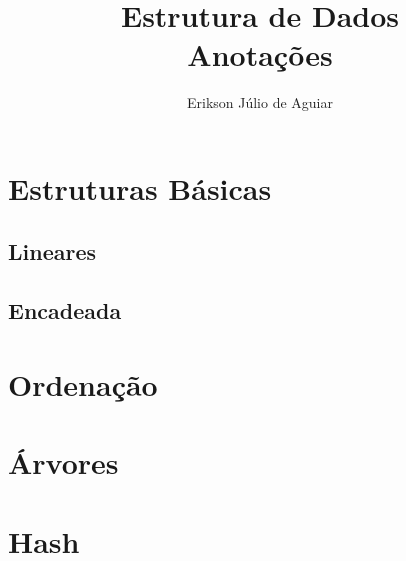 \documentclass[runningheads,a4paper]{llncs}
\begin{document}
\mainmatter 

\title{Estrutura de Dados\\ Anotações}


\author{Erikson Júlio de Aguiar}



\tocauthor{{}}

\maketitle

\begin{abstract}

\end{abstract}

\medskip

\begingroup
\let\clearpage\relax
\tableofcontents
\endgroup

\section{Estruturas Básicas}

\subsection{Lineares}

\subsection{Encadeada}

\section{Ordenação}

\section{Árvores}

\section{Hash}


\medskip
\medskip



\end{document}
